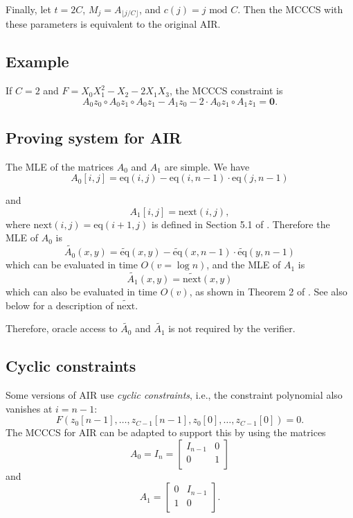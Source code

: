 \documentclass[a4paper]{article}
\begin{document}
Finally, let $t=2C$, $M_j=A_{\lfloor j/C \rfloor}$, and $c(j)=j \text{ mod } C$. Then the MCCCS with these parameters is equivalent to the original AIR.

\subsection*{Example}

If $C=2$ and $F = X_0 X_1^2 - X_2 - 2X_1X_3$, the MCCCS constraint is
$$
A_0 z_0 \circ A_0z_1 \circ A_0z_1 - A_1 z_0 -2\cdot A_0 z_1 \circ A_1z_1 = \mathbf{0}. 
$$

\subsection*{Proving system for AIR}
The MLE of the matrices $A_0$ and $A_1$ are simple. We have 
$$A_0[i,j] = \text{eq}(i,j)-\text{eq}(i,n-1)\cdot \text{eq}(j,n-1)$$

and 
$$A_1[i,j]=\text{next}(i,j),$$ where $\text{next}(i,j)=\text{eq}(i+1,j)$ is defined in Section 5.1 of \cite{cryptoeprint:2023/552}. Therefore the MLE of $A_0$ is 
$$\widetilde{A_0}(x,y) = \widetilde{\text{eq}}(x,y)-\widetilde{\text{eq}}(x,n-1)\cdot \widetilde{\text{eq}}(y,n-1)$$
which can be evaluated in time $O(v=\log n)$, and the MLE of $A_1$ is
$$\widetilde{A_1}(x,y) = \widetilde{\text{next}}(x,y)$$
which can also be evaluated in time $O(v)$, as shown in Theorem 2 of \cite{cryptoeprint:2023/552}. See also below for a description of $\widetilde{\text{next}}$.

Therefore, oracle access to $\widetilde{A_0}$ and $\widetilde{A_1}$ is not required by the verifier.

\subsection*{Cyclic constraints}

Some versions of AIR use \emph{cyclic constraints}, i.e., the constraint polynomial also vanishes at $i=n-1$:
$$
F(z_0[n-1],\dots,z_{C-1}[n-1],z_0[0],\dots,z_{C-1}[0])=0.
$$
The MCCCS for AIR can be adapted to support this by using the matrices 
$$ A_0 = I_n =
\begin{bmatrix}
I_{n-1} & 0 \\
0 & 1      \\
\end{bmatrix}
$$
and
$$
A_1 = 
\begin{bmatrix}
0 & I_{n-1} \\
1 & 0      \\
\end{bmatrix}.
$$
\end{document}
